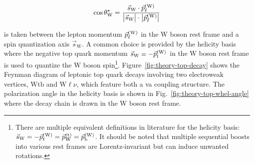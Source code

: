 \begin{equation}
\cos\theta^\star_\mathrm{W}=\frac{\vec{s}_\mathrm{W}\cdot\vec{p}_{\ell}^\scriptn{\mathrm{(W)}}}{\big|\vec{s}_\mathrm{W}\big|\cdot\big|\vec{p}_{\ell}^\scriptn{\mathrm{(W)}}\big|}
\end{equation}

is taken between the lepton momentum $\vec{p}_{\ell}^\scriptn{\mathrm{(W)}}$ in the W boson rest frame and a spin quantization axis $\vec{s}_\mathrm{W}$. A common choice is provided by the helicity basis where the negative top quark momentum $\vec{s}_\mathrm{W}=-\vec{p}_\mathrm{t}^\scriptn{\mathrm{(W)}}$ in the $\mathrm{W}$ boson rest frame is used to quantize the W boson spin\footnote{There are multiple equivalent definitions in literature for the helicity basis: $\vec{s}_\mathrm{W}=-\vec{p}_\mathrm{t}^\scriptn{\mathrm{(W)}}=\vec{p}_\mathrm{W}^\scriptn{\mathrm{(t)}}=\vec{p}_\mathrm{b}^\scriptn{\mathrm{(W)}}$. It should be noted that multiple sequential boosts into various rest frames are Lorentz-invariant but can induce unwanted rotations.}. Figure~\ref{fig:theory-top-decay} shows the Feynman diagram of leptonic top quark decays involving two electroweak vertices, $\mathrm{Wtb}$ and $\mathrm{W}\ell\nu$, which feature both a \gls{va} coupling structure. The polarization angle in the helicity basis is shown in Fig.~\ref{fig:theory-top-whel-angle} where the decay chain is drawn in the W boson rest frame.


